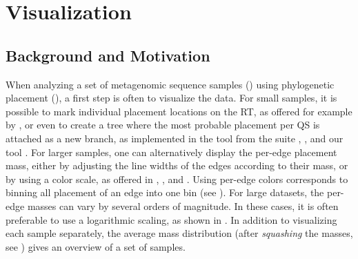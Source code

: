 
\chapter{Visualization}
\label{ch:Visualization}



\section{Background and Motivation}
\label{ch:Visualization:sec:Motivation}

When analyzing a set of metagenomic sequence samples ()
using phylogenetic placement (),
a first step is often to visualize the data.
For small samples, it is possible to mark individual placement locations on the \acf{RT},
as offered for example by  \cite{Letunic2016},
or even to create a tree where the most probable placement per \acf{QS} is attached as a new branch,
as implemented in the  tool from the  suite \cite{Matsen2010},
 \cite{Berger2011,Stamatakis2014}, and our tool .
For larger samples, one can alternatively display the per-edge placement mass,
either by adjusting the line widths of the edges according to their mass, or by using a color scale,
as offered in  \cite{Yu2017}, , and .
Using per-edge colors corresponds to binning all placement of an edge into one bin
(see ).
For large datasets, the per-edge masses can vary by several orders of magnitude.
In these cases, it is often preferable to use a logarithmic scaling, as shown in \cite{Mahe2017}.
In addition to visualizing each sample separately, the average mass distribution
(after \emph{squashing} the masses,
see )
gives an overview of a set of samples.

